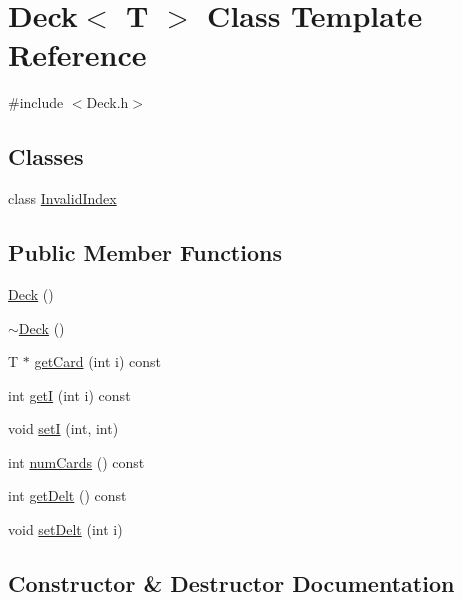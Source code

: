\hypertarget{class_deck}{}\section{Deck$<$ T $>$ Class Template Reference}
\label{class_deck}


{\ttfamily \#include $<$Deck.\+h$>$}

\subsection*{Classes}
\begin{DoxyCompactItemize}
\item 
class \mbox{\hyperlink{class_deck_1_1_invalid_index}{Invalid\+Index}}
\end{DoxyCompactItemize}
\subsection*{Public Member Functions}
\begin{DoxyCompactItemize}
\item 
\mbox{\hyperlink{class_deck_a7cb6b63b067cdaf3de1baeb5534d7271}{Deck}} ()
\item 
\mbox{\hyperlink{class_deck_ab3294d971f9ecf25fd92d982aa2efad9}{$\sim$\+Deck}} ()
\item 
T $\ast$ \mbox{\hyperlink{class_deck_a66c6921f4ecf8c1b8653e9c4b787c150}{get\+Card}} (int i) const
\item 
int \mbox{\hyperlink{class_deck_ae14e1d90f79f0feab99036164559cdd9}{getI}} (int i) const
\item 
void \mbox{\hyperlink{class_deck_a1714bb774b90483499d9aab08a7a29ae}{setI}} (int, int)
\item 
int \mbox{\hyperlink{class_deck_add2b30cd032ad01e7397ec0dc333419a}{num\+Cards}} () const
\item 
int \mbox{\hyperlink{class_deck_ae5cf657c1089ee0d88606c7e63feeb5d}{get\+Delt}} () const
\item 
void \mbox{\hyperlink{class_deck_ad0aa6682496d7d68ea1799e2e0b596db}{set\+Delt}} (int i)
\end{DoxyCompactItemize}


\subsection{Constructor \& Destructor Documentation}
\mbox{\label{class_deck_a7cb6b63b067cdaf3de1baeb5534d7271}} 
